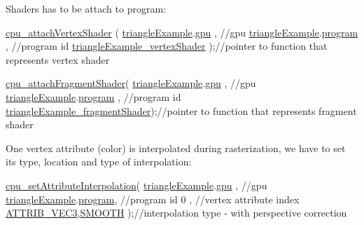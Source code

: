 Shaders has to be attach to program\+: 
\begin{DoxyCodeInclude}
  \hyperlink{program_8h_aaefc7833a6deea461cc06d00318f7975}{cpu\_attachVertexShader}  (
      \hyperlink{triangleExample_8c_af82b723635ac0c90962571915a1b1163}{triangleExample}.\hyperlink{structTriangleExampleVariables_a6c5c3f82065ae9aac07f9e6f11dd03b3}{gpu}           , \textcolor{comment}{//gpu}
      \hyperlink{triangleExample_8c_af82b723635ac0c90962571915a1b1163}{triangleExample}.\hyperlink{structTriangleExampleVariables_aabf788228d2e91e2718facfbd911c8cc}{program}       , \textcolor{comment}{//program id}
      \hyperlink{triangleExample_8c_ae87aa91cb96803929e3d70f2ee66794c}{triangleExample\_vertexShader}  );\textcolor{comment}{//pointer to function that represents
       vertex shader}

  \hyperlink{program_8h_a402ad69a9f1b80b8de408b991e190ed6}{cpu\_attachFragmentShader}(
      \hyperlink{triangleExample_8c_af82b723635ac0c90962571915a1b1163}{triangleExample}.\hyperlink{structTriangleExampleVariables_a6c5c3f82065ae9aac07f9e6f11dd03b3}{gpu}           , \textcolor{comment}{//gpu}
      \hyperlink{triangleExample_8c_af82b723635ac0c90962571915a1b1163}{triangleExample}.\hyperlink{structTriangleExampleVariables_aabf788228d2e91e2718facfbd911c8cc}{program}       , \textcolor{comment}{//program id}
      \hyperlink{triangleExample_8c_a098ba4902bcb365ea8faaa20be1994f4}{triangleExample\_fragmentShader});\textcolor{comment}{//pointer to function that represents
       fragment shader}
\end{DoxyCodeInclude}
One vertex attribute (color) is interpolated during rasterization, we have to set its type, location and type of interpolation\+: 
\begin{DoxyCodeInclude}
  \hyperlink{program_8h_aca1c5019ec58c919160c4c12a5e5fa06}{cpu\_setAttributeInterpolation}(
      \hyperlink{triangleExample_8c_af82b723635ac0c90962571915a1b1163}{triangleExample}.\hyperlink{structTriangleExampleVariables_a6c5c3f82065ae9aac07f9e6f11dd03b3}{gpu}    , \textcolor{comment}{//gpu}
      \hyperlink{triangleExample_8c_af82b723635ac0c90962571915a1b1163}{triangleExample}.\hyperlink{structTriangleExampleVariables_aabf788228d2e91e2718facfbd911c8cc}{program}, \textcolor{comment}{//program id}
      0                      , \textcolor{comment}{//vertex attribute index}
      \hyperlink{program_8h_a349a9cde14be8097df865ba0469c0ab2af145276fddc920ef58a00542e097c47a}{ATTRIB\_VEC3},\hyperlink{program_8h_a8472f01c511d77bbfb981a46618ea1eaa33c7ccbb848d8fd75455dd9786a1153a}{SMOOTH}     );\textcolor{comment}{//interpolation type - with perspective correction}
\end{DoxyCodeInclude}
